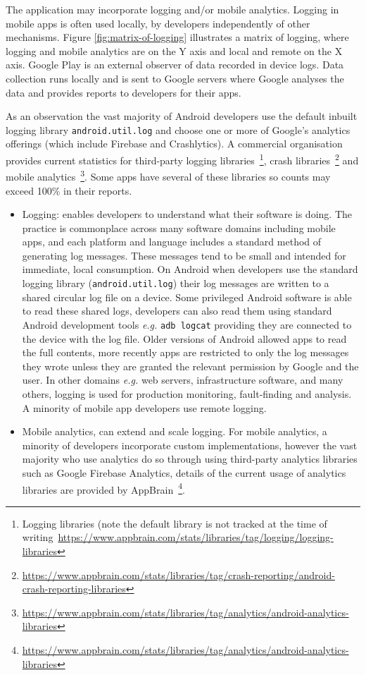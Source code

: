 The application may incorporate logging and/or mobile analytics. Logging in mobile apps is often used locally, by developers independently of other mechanisms. Figure \ref{fig:matrix-of-logging} illustrates a matrix of logging, where logging and mobile analytics are on the Y axis and local and remote on the X axis. Google Play is an external observer of data recorded in device logs. Data collection runs locally and is sent to Google servers where Google analyses the data and provides reports to developers for their apps.

As an observation the vast majority of Android developers use the default inbuilt logging library \texttt{android.util.log} and choose one or more of Google's analytics offerings (which include Firebase and Crashlytics). A commercial organisation provides current statistics for third-party logging libraries~\footnote{Logging libraries (note the default library is not tracked at the time of writing~\url{https://www.appbrain.com/stats/libraries/tag/logging/logging-libraries}}, crash libraries~\footnote{\url{https://www.appbrain.com/stats/libraries/tag/crash-reporting/android-crash-reporting-libraries}} and mobile analytics~\footnote{\url{https://www.appbrain.com/stats/libraries/tag/analytics/android-analytics-libraries}}. Some apps have several of these libraries so counts may exceed 100\% in their reports.

\begin{itemize}
    \item Logging: enables developers to understand what their software is doing. The practice is commonplace across many software domains including mobile apps, and each platform and language includes a standard method of generating log messages. These messages tend to be small and intended for immediate, local consumption. On Android when developers use the standard logging library (\texttt{android.util.log}) their log messages are written to a shared circular log file on a device. Some privileged Android software is able to read these shared logs, developers can also read them using standard Android development tools \emph{e.g.} \texttt{adb logcat} providing they are connected to the device with the log file. Older versions of Android allowed apps to read the full contents, more recently apps are restricted to only the log messages they wrote unless they are granted the relevant permission by Google and the user. 
    In other domains \emph{e.g.} web servers, infrastructure software, and many others, logging is used for production monitoring, fault-finding and analysis. A minority of mobile app developers use remote logging.
    \item Mobile analytics, can extend and scale logging. For mobile analytics, a minority of developers incorporate custom implementations, however the vast majority who use analytics do so through using third-party analytics libraries such as Google Firebase Analytics, details of the current usage of analytics libraries are provided by AppBrain~\footnote{\url{https://www.appbrain.com/stats/libraries/tag/analytics/android-analytics-libraries}}.
\end{itemize}

